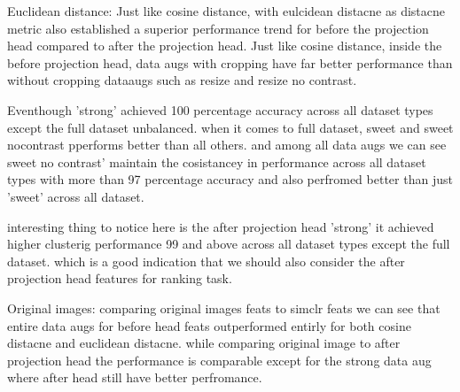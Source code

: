     
Euclidean distance:
Just like  cosine distance, with eulcidean distacne as distacne metric also established a superior performance trend for before the projection head compared to after the
 projection head.
 Just like  cosine distance, inside the before projection head, data augs with cropping have far better performance than without cropping dataaugs such as resize and 
 resize no contrast.

 Eventhough 'strong' achieved 100 percentage accuracy across all dataset types except the full dataset unbalanced. when it comes to full dataset, sweet and sweet nocontrast pperforms better than all others.
 and among all data augs we can see sweet no contrast' maintain the cosistancey in performance across all dataset types with more than 97 percentage accuracy and also perfromed better than just 'sweet' across all dataset.
 
 interesting thing to notice here is the after projection head  'strong' it achieved higher clusterig performance 99 and above across all dataset types except 
 the full dataset. which is a good indication that we should also consider the after projection head features for ranking task.

    \begin{table}[H]
        \centering
        \caption{Evaluation Results Using Different Distance Metrics for original images}
        \label{tab:distance_metrics}
    \end{table}
    
Original images:
comparing original images feats to simclr feats we can see that entire data augs for  before head feats outperformed entirly for both cosine distacne and euclidean distacne.
while comparing original image to after projection head the performance is comparable except for the strong data aug where after head still have better perfromance.

